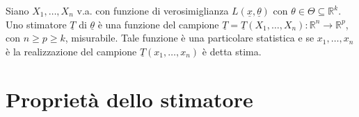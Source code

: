 \documentclass[hidelinks, 10pt]{report}
\begin{document}
\begin{defn}
Siano $ X_1, \dotsc, X_n $ v.a. con funzione di verosimiglianza $ L(\underline{x}, \underline{\theta}) $ con $ \theta \in \Theta \subseteq \mathbb{R}^k $. Uno stimatore $ \underline{T} $ di $ \underline{\theta} $ \`e una funzione del campione $ \underline{T} = \underline{T} (X_1, \dotsc, X_n) : \mathbb{R}^n \to \mathbb{R}^p $, con $ n \ge p \ge k $, misurabile. Tale funzione \`e una particolare statistica e se $ x_1, \dotsc, x_n $ \`e la realizzazione del campione $ \underline{T} (x_1, \dotsc, x_n) $ \`e detta stima. 
\end{defn}

\section{Propriet\`a dello stimatore}
\end{document}
